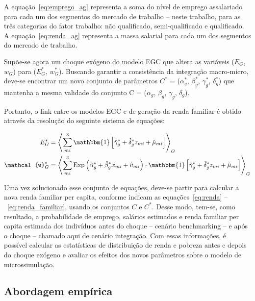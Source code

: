 A equação~\eqref{eq:emprego_ag} representa a soma do nível de emprego assalariado para cada um dos segmentos do mercado de trabalho -- neste trabalho, para as três categorias do fator trabalho: não qualificado, semi-qualificado e qualificado. A equação~\eqref{eq:renda_ag} representa a massa salarial para cada um dos segmentos do mercado de trabalho.

Supõe-se agora um choque exógeno do modelo EGC que altera as variáveis ($E_G$, $w_G$) para ($E_G^*$, $w_G^*$). Buscando garantir a consistência da integração macro-micro, deve-se encontrar um novo conjunto de parâmetros $C^*$ = ($\alpha_g^*$, $\beta_g^*$, $\gamma_g^*$, $\delta_g^*$) que mantenha a mesma validade do conjunto C = ($\alpha_g$, $\beta_g$, $\gamma_g$, $\delta_g$). 

Portanto, o link entre os modelos EGC e de geração da renda familiar é obtido através da resolução do seguinte sistema de equações:

\begin{align}
	E_G^* &= \left\langle \sum_{mi}^{3} \mathbbm{1} \left[ \hat{\gamma}_{g}^* + \hat{\delta}_{g}^* z_{mi} + \hat{\mu}_{mi} \right] \right\rangle_{G} \label{eq:emprego_ag*} \\
	\mathcal{w}_G^* &= \left\langle \sum_{mi}^{3} \text{Exp} \left( \hat{\alpha}_g^* + \hat{\beta}_g^* x_{mi} + \hat{\upsilon}_{mi} \right) \cdot \mathbbm{1} \left[ \hat{\gamma}_{g}^* + \hat{\delta}_{g}^* z_{mi} + \hat{\mu}_{mi} \right] \right\rangle_{G} \label{eq:renda_ag*}
\end{align}

Uma vez solucionado esse conjunto de equações, deve-se partir para calcular a nova renda familiar per capita, conforme indicam as equações~\eqref{eq:renda} --~\eqref{eq:renda_familiar}, usando os conjuntos $C$ e $C^*$. Desse modo, tem-se, como resultado, a probabilidade de emprego, salários estimados e renda familiar per capita estimada dos indivíduos antes do choque -- cenário benchmarking -- e após o choque -- chamado aqui de cenário integração. Com essas informações, é possível calcular as estatísticas de distribuição de renda e pobreza antes e depois do choque exógeno e avaliar os efeitos dos novos parâmetros sobre o modelo de microssimulação.


\subsection{Abordagem empírica} \label{subsec:abordagem_empirica}

